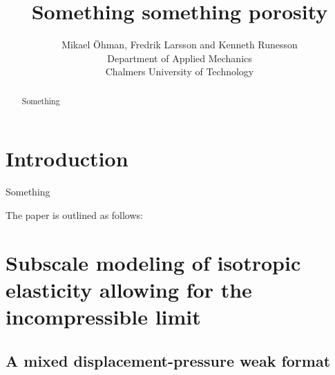 \documentclass[12pt,a4paper]{article}
\title{Something something porosity}
\author{
Mikael Öhman, Fredrik Larsson and Kenneth Runesson\\
Department of Applied Mechanics \\
Chalmers University of Technology}
\begin{document}
\maketitle
\begin{abstract}
Something
\end{abstract}

\section{Introduction}

Something

The paper is outlined as follows:


\section{Subscale modeling of isotropic elasticity allowing for the incompressible limit}

\subsection{A mixed displacement-pressure weak format}
\end{document}
